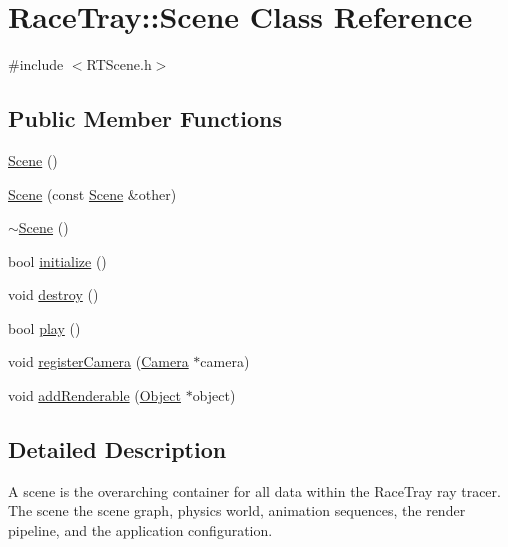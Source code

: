 \hypertarget{class_race_tray_1_1_scene}{\section{Race\-Tray\-:\-:Scene Class Reference}
\label{class_race_tray_1_1_scene}
}


{\ttfamily \#include $<$R\-T\-Scene.\-h$>$}

\subsection*{Public Member Functions}
\begin{DoxyCompactItemize}
\item 
\hyperlink{class_race_tray_1_1_scene_ab0b893217e6108982c963586a3eed7a1}{Scene} ()
\item 
\hyperlink{class_race_tray_1_1_scene_a64dbc6679f6543c06229efc87725532b}{Scene} (const \hyperlink{class_race_tray_1_1_scene}{Scene} \&other)
\item 
\hyperlink{class_race_tray_1_1_scene_af7c0fb4d0f3d4a10b50fb340376eed21}{$\sim$\-Scene} ()
\item 
bool \hyperlink{class_race_tray_1_1_scene_a6c01bc164fe3188f9de317b5176bcd18}{initialize} ()
\item 
void \hyperlink{class_race_tray_1_1_scene_abf3e9e56a8d5af553d0805fbdc807aeb}{destroy} ()
\item 
bool \hyperlink{class_race_tray_1_1_scene_a50293de9c949fbf279549d6618aa7dfb}{play} ()
\item 
void \hyperlink{class_race_tray_1_1_scene_aee10122e6078860b355900ff978832b1}{register\-Camera} (\hyperlink{class_race_tray_1_1_camera}{Camera} $\ast$camera)
\item 
void \hyperlink{class_race_tray_1_1_scene_a5501e7115475096e3b5753a209cf4af0}{add\-Renderable} (\hyperlink{class_race_tray_1_1_object}{Object} $\ast$object)
\end{DoxyCompactItemize}


\subsection{Detailed Description}
A scene is the overarching container for all data within the Race\-Tray ray tracer. The scene the scene graph, physics world, animation sequences, the render pipeline, and the application configuration. 

